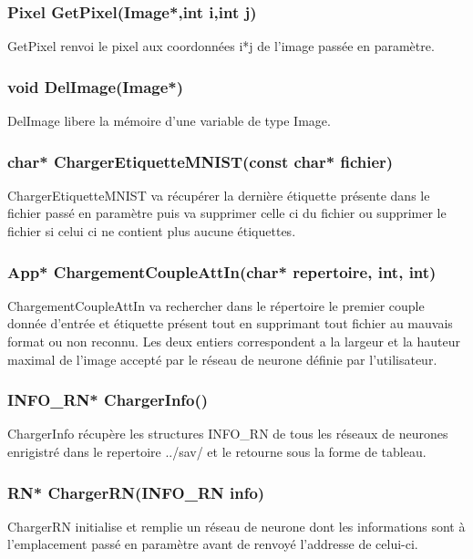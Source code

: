 \documentclass{article}
\begin{document}
		\subsubsection{\textcolor{myblue}{\textbf{Pixel}} GetPixel(\textcolor{myblue}{\textbf{Image*}},\textcolor{myblue}{\textbf{int}} i,\textcolor{myblue}{\textbf{int}} j)}
		GetPixel renvoi le pixel aux coordonnées i*j de l'image passée en paramètre.
		
		\subsubsection{\textcolor{myblue}{\textbf{void}} DelImage(\textcolor{myblue}{\textbf{Image*}})}
		DelImage libere la mémoire d'une variable de type Image.
		
		\subsubsection{\textcolor{myblue}{\textbf{char*}} ChargerEtiquetteMNIST(\textcolor{myblue}{\textbf{const char*}} fichier)}
		ChargerEtiquetteMNIST va récupérer la dernière étiquette présente dans le fichier passé en paramètre puis va supprimer celle ci du fichier ou supprimer le fichier si celui ci ne contient plus aucune étiquettes.
		
		\subsubsection{\textcolor{myblue}{\textbf{App*}} ChargementCoupleAttIn(\textcolor{myblue}{\textbf{char*}} repertoire, \textcolor{myblue}{\textbf{int}}, \textcolor{myblue}{\textbf{int}})}
		ChargementCoupleAttIn va rechercher dans le répertoire le premier couple donnée d'entrée et étiquette présent tout en supprimant tout fichier au mauvais format ou non reconnu. Les deux entiers correspondent a la largeur et la hauteur maximal de l'image accepté par le réseau de neurone définie par l'utilisateur.
		
		\subsubsection{\textcolor{myblue}{\textbf{INFO\_RN*}} ChargerInfo()}
		ChargerInfo récupère les structures INFO\_RN de tous les réseaux de neurones enrigistré dans le repertoire ../sav/ et le retourne sous la forme de tableau.
		
		\subsubsection{\textcolor{myblue}{\textbf{RN*}} ChargerRN(\textcolor{myblue}{\textbf{INFO\_RN}} info)}
		ChargerRN initialise et remplie un réseau de neurone dont les informations sont à l'emplacement passé en paramètre avant de renvoyé l'addresse de celui-ci.
		
\end{document}
